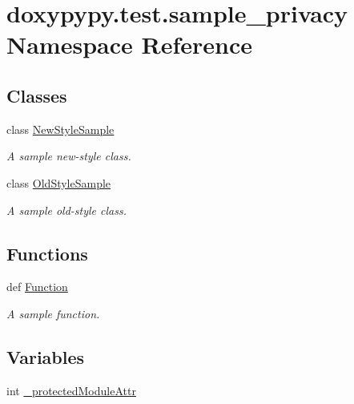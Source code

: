 \hypertarget{namespacedoxypypy_1_1test_1_1sample__privacy}{\section{doxypypy.\-test.\-sample\-\_\-privacy Namespace Reference}
\label{namespacedoxypypy_1_1test_1_1sample__privacy}
}
\subsection*{Classes}
\begin{DoxyCompactItemize}
\item 
class \hyperlink{classdoxypypy_1_1test_1_1sample__privacy_1_1_new_style_sample}{New\-Style\-Sample}
\begin{DoxyCompactList}\small\item\em A sample new-\/style class. \end{DoxyCompactList}\item 
class \hyperlink{classdoxypypy_1_1test_1_1sample__privacy_1_1_old_style_sample}{Old\-Style\-Sample}
\begin{DoxyCompactList}\small\item\em A sample old-\/style class. \end{DoxyCompactList}\end{DoxyCompactItemize}
\subsection*{Functions}
\begin{DoxyCompactItemize}
\item 
def \hyperlink{namespacedoxypypy_1_1test_1_1sample__privacy_a4a01765069655cc49ba0ce2949529987}{Function}
\begin{DoxyCompactList}\small\item\em A sample function. \end{DoxyCompactList}\end{DoxyCompactItemize}
\subsection*{Variables}
\begin{DoxyCompactItemize}
\item 
int \hyperlink{namespacedoxypypy_1_1test_1_1sample__privacy_a2b3f4184058c232e4404e62682b1a921}{\-\_\-protected\-Module\-Attr}
\end{DoxyCompactItemize}


